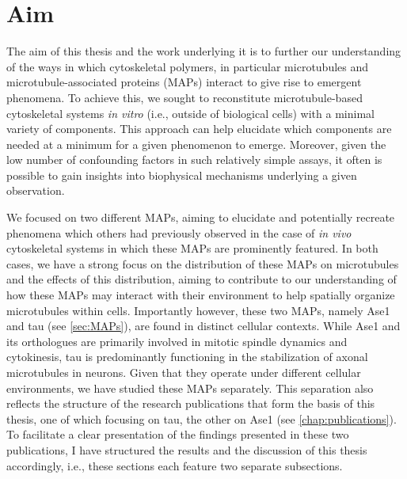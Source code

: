 \chapter{Aim}
The aim of this thesis and the work underlying it is to further our understanding of the ways in which cytoskeletal polymers, in particular microtubules and microtubule-associated proteins (MAPs) interact to give rise to emergent phenomena. To achieve this, we sought to reconstitute microtubule-based cytoskeletal systems \textit{in vitro} (i.e., outside of biological cells) with a minimal variety of components. This approach can help elucidate which components are needed at a minimum for a given phenomenon to emerge. Moreover, given the low number of confounding factors in such relatively simple assays, it often is possible to gain insights into biophysical mechanisms underlying a given observation. \par
We focused on two different MAPs, aiming to elucidate and potentially recreate phenomena which others had previously observed in the case of \textit{in vivo} cytoskeletal systems in which these MAPs are prominently featured. In both cases, we have a strong focus on the distribution of these MAPs on microtubules and the effects of this distribution, aiming to contribute to our understanding of how these MAPs may interact with their environment to help spatially organize microtubules within cells. Importantly however, these two MAPs, namely Ase1 and tau (see \autoref{sec:MAPs}), are found in distinct cellular contexts. While Ase1 and its orthologues are primarily involved in mitotic spindle dynamics and cytokinesis, tau is predominantly functioning in the stabilization of axonal microtubules in neurons. Given that they operate under different cellular environments, we have studied these MAPs separately. This separation also reflects the structure of the research publications that form the basis of this thesis, one of which focusing on tau, the other on Ase1 (see \autoref{chap:publications}). To facilitate a clear presentation of the findings presented in these two publications, I have structured the results and the discussion of this thesis accordingly, i.e., these sections each feature two separate subsections.